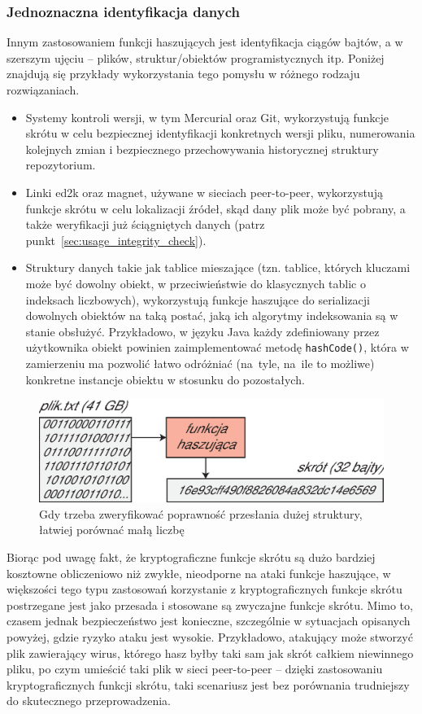 \documentclass[12pt,a4paper,twoside]{article}
\begin{document}
\subsubsection{Jednoznaczna identyfikacja danych}

Innym zastosowaniem funkcji haszujących jest identyfikacja ciągów bajtów, a w
szerszym ujęciu -- plików, struktur/obiektów programistycznych itp. Poniżej
znajdują się przykłady wykorzystania tego pomysłu w różnego rodzaju
rozwiązaniach.
\begin{itemize}
\item Systemy kontroli wersji, w tym Mercurial oraz Git, wykorzystują funkcje
skrótu w celu bezpiecznej identyfikacji konkretnych wersji pliku, numerowania
kolejnych zmian i bezpiecznego przechowywania historycznej struktury
repozytorium.

\item Linki ed2k oraz magnet, używane w sieciach peer-to-peer, wykorzystują
funkcje skrótu w celu lokalizacji źródeł, skąd dany plik może być pobrany, a
także weryfikacji już ściągniętych danych (patrz
punkt~\ref{sec:usage_integrity_check}).
\item Struktury danych takie jak tablice mieszające (tzn. tablice, których
kluczami może być dowolny obiekt, w przeciwieństwie do klasycznych tablic o
indeksach liczbowych), wykorzystują funkcje haszujące do serializacji dowolnych
obiektów na taką postać, jaką ich algorytmy indeksowania są w stanie obsłużyć.
Przykładowo, w języku Java każdy zdefiniowany przez użytkownika obiekt powinien
zaimplementować metodę \texttt{hashCode()}, która w zamierzeniu ma pozwolić
łatwo odróżniać (na~tyle, na~ile to możliwe) konkretne instancje obiektu w
stosunku do pozostałych.
\end{itemize}

\begin{figure}[bht]
\includegraphics[width=12cm]{img/usage3.eps}
\caption{Gdy trzeba zweryfikować poprawność przesłania dużej struktury, łatwiej
porównać małą liczbę}
\end{figure}

Biorąc pod uwagę fakt, że kryptograficzne funkcje skrótu są dużo bardziej
kosztowne obliczeniowo niż zwykłe, nieodporne na ataki funkcje haszujące, w
większości tego typu zastosowań korzystanie z kryptograficznych funkcje skrótu
postrzegane jest jako przesada i stosowane są zwyczajne funkcje skrótu. Mimo
to, czasem jednak bezpieczeństwo jest konieczne, szczególnie w sytuacjach
opisanych powyżej, gdzie ryzyko ataku jest wysokie. Przykładowo, atakujący może
stworzyć plik zawierający wirus, którego hasz byłby taki sam jak skrót całkiem
niewinnego pliku, po czym umieścić taki plik w sieci peer-to-peer -- dzięki
zastosowaniu kryptograficznych funkcji skrótu, taki scenariusz jest bez
porównania trudniejszy do skutecznego przeprowadzenia.
\end{document}
